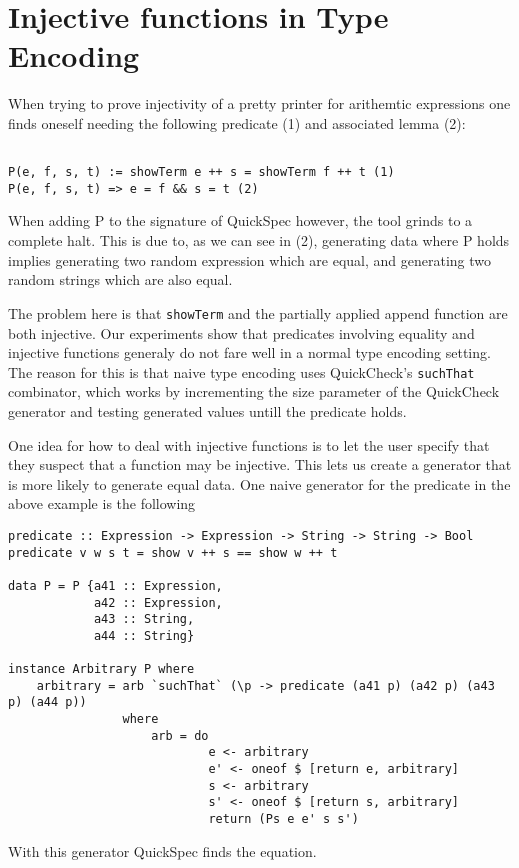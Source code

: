 \section{Injective functions in Type Encoding}
When trying to prove injectivity of a pretty printer for arithemtic expressions one
finds oneself needing the following predicate (1) and associated lemma (2):
\begin{verbatim}

P(e, f, s, t) := showTerm e ++ s = showTerm f ++ t (1)
P(e, f, s, t) => e = f && s = t (2)

\end{verbatim}
When adding P to the signature of QuickSpec however, the tool grinds to a complete halt. This is
due to, as we can see in (2), generating data where P holds implies generating two
random expression which are equal, and generating two random strings which are also equal.

The problem here is that \texttt{showTerm} and the partially applied append function are both injective.
Our experiments show that predicates involving equality and injective functions generaly do not
fare well in a normal type encoding setting. The reason for this is that naive type encoding uses
QuickCheck's \texttt{suchThat} combinator, which works by incrementing the size parameter of the QuickCheck
generator and testing generated values untill the predicate holds.

One idea for how to deal with injective functions is to let the user specify that they suspect that 
a function may be injective. This lets us create a generator that is more likely to generate
equal data. One naive generator for the predicate in the above example is the following
\begin{verbatim}
predicate :: Expression -> Expression -> String -> String -> Bool
predicate v w s t = show v ++ s == show w ++ t

data P = P {a41 :: Expression,
            a42 :: Expression,
            a43 :: String,
            a44 :: String}

instance Arbitrary P where
    arbitrary = arb `suchThat` (\p -> predicate (a41 p) (a42 p) (a43 p) (a44 p))
                where
                    arb = do
                            e <- arbitrary
                            e' <- oneof $ [return e, arbitrary]
                            s <- arbitrary
                            s' <- oneof $ [return s, arbitrary]
                            return (Ps e e' s s')
\end{verbatim}
With this generator QuickSpec finds the equation.

